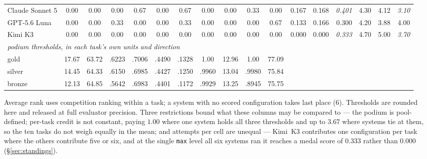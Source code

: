 \begin{table}[t]
\begin{adjustbox}{max width=\linewidth}
\begin{tabular}{lcccccccccc rrr rrr}
Claude Sonnet 5 & 0.00 & 0.00 & 0.00 & 0.67 & 0.00 & 0.67 & 0.00 & 0.00 & 0.33 & 0.00 & 0.167 & 0.168 & \emph{0.401} & 4.30 & 4.12 & \emph{3.10} \\
GPT-5.6 Luna & 0.00 & 0.00 & 0.33 & 0.00 & 0.00 & 0.33 & 0.00 & 0.00 & 0.00 & 0.67 & 0.133 & 0.166 & 0.300 & 4.20 & 3.88 & 4.00 \\
Kimi K3 & 0.00 & 0.00 & 0.00 & 0.00 & 0.00 & 0.00 & 0.00 & 0.00 & 0.00 & 0.00 & 0.000 & 0.000 & \emph{0.333} & 4.70 & 5.00 & \emph{3.70} \\
\midrule
\multicolumn{17}{l}{\emph{podium thresholds, in each task's own units and direction}} \\
\footnotesize gold & \footnotesize 17.67 & \footnotesize 63.72 & \footnotesize .6223 & \footnotesize .7006 & \footnotesize .4490 & \footnotesize .1328 & \footnotesize 1.00 & \footnotesize 12.96 & \footnotesize 1.00 & \footnotesize 77.09 & & & & & & \\
\footnotesize silver & \footnotesize 14.45 & \footnotesize 64.33 & \footnotesize .6150 & \footnotesize .6985 & \footnotesize .4427 & \footnotesize .1250 & \footnotesize .9960 & \footnotesize 13.04 & \footnotesize .9980 & \footnotesize 75.84 & & & & & & \\
\footnotesize bronze & \footnotesize 12.13 & \footnotesize 64.85 & \footnotesize .5642 & \footnotesize .6983 & \footnotesize .4401 & \footnotesize .1172 & \footnotesize .9929 & \footnotesize 13.25 & \footnotesize .8945 & \footnotesize 75.75 & & & & & & \\
\bottomrule
\end{tabular}
\end{adjustbox}
\par\vspace{2pt}
{\footnotesize Average rank uses competition ranking within a task; a system with no scored
configuration takes last place ($6$). Thresholds are rounded here and released at full evaluator
precision. Three restrictions bound what these columns may be compared to --- the podium is pool-defined; per-task credit is not constant, paying
$1.00$ where one system holds all three thresholds and up to $3.67$ where systems tie at them, so the
ten tasks do not weigh equally in the mean; and attempts per cell are unequal --- Kimi~K3 contributes one configuration per task where the others
contribute five or six, and at the single \texttt{max} level all six systems ran it reaches a medal
score of $0.333$ rather than $0.000$ (\S\ref{sec:standings}).}
\end{table}
